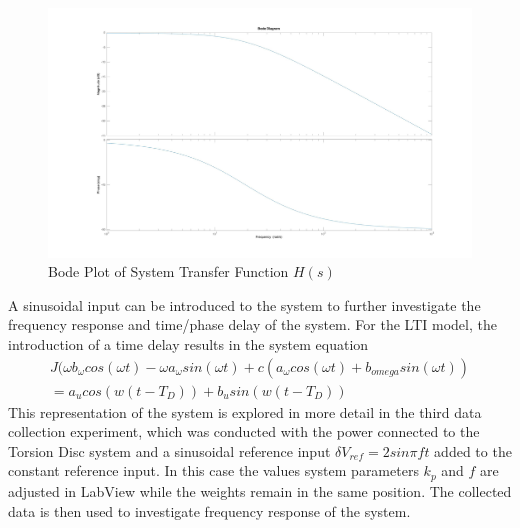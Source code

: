 \documentclass[11pt,titlepage]{article}
\begin{document}
	\begin{figure}[h!]
		\centering
		\includegraphics[scale=0.15]{bode_Hs}
		\caption{Bode Plot of System Transfer Function $H(s)$}
		\label{fig:bode_Hs}
	\end{figure}
	A sinusoidal input can be introduced to the system to further investigate the frequency response and time/phase delay of the system. For the LTI model, the introduction of a time delay results in the system equation 
	\begin{multline}
		J(\omega b_{\omega}cos(\omega t)-\omega a_{\omega}sin(\omega t)+c(a_{\omega}cos(\omega t)+b_{omega}sin(\omega t))\\
        = a_ucos(w(t-T_D))+b_usin(w(t-T_D))
	\end{multline}
	This representation of the system is explored in more detail in the third data collection experiment, which was conducted with the power connected to the Torsion Disc system and a sinusoidal reference input $\delta V_{ref}=2sin\pi ft$ added to the constant reference input. In this case the values system parameters $k_p$ and $f$ are adjusted in LabView while the weights remain in the same position. The collected data is then used to investigate frequency response of the system.
\end{document}
